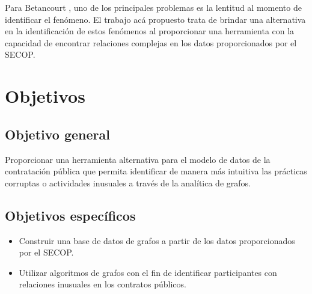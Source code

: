 \documentclass[11pt,letterpaper,oneside]{article}
\begin{document}
Para Betancourt \cite{Betancourt-2018}, uno de los principales problemas es la lentitud al momento de identificar el fenómeno. El trabajo acá propuesto trata de brindar una alternativa en la identificación de estos fenómenos al proporcionar una herramienta con la capacidad de encontrar relaciones complejas en los datos proporcionados por el SECOP.

\newpage
\section{Objetivos}
	\subsection{Objetivo general}
Proporcionar una herramienta alternativa para el modelo de datos de la contratación pública que permita identificar de manera más intuitiva las prácticas corruptas o actividades inusuales a través de la analítica de grafos.	
	\subsection{Objetivos específicos}
	\begin{itemize}
	\item Construir una base de datos de grafos a partir de los datos proporcionados por el SECOP.
	\item Utilizar algoritmos de grafos con el fin de identificar participantes con relaciones inusuales en los contratos públicos.
	\end{itemize}
\end{document}
